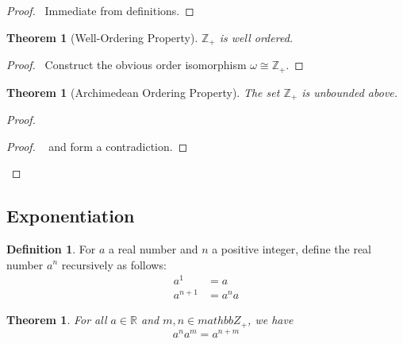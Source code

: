 \documentclass{book}
\let\qed\relax
\newtheorem{thm}[ax]{Theorem}
\theoremstyle{definition}
\newtheorem{df}[ax]{Definition}
\begin{document}
\begin{proof}
\pf\ Immediate from definitions. \qed
\end{proof}

\begin{thm}[Well-Ordering Property]
$\mathbb{Z}_+$ is well ordered.
\end{thm}

\begin{proof}
\pf\ Construct the obvious order isomorphism $\omega \cong \mathbb{Z}_+$. \qed
\end{proof}

\begin{thm}[Archimedean Ordering Property]
The set $\mathbb{Z}_+$ is unbounded above.
\end{thm}

\begin{proof}
\pf
{}
\qedstep
\begin{proof}
	\pf\  and  form a contradiction.
\end{proof}
\qed
\end{proof}

\subsection{Exponentiation}

\begin{df}
For $a$ a real number and $n$ a positive integer, define the real number $a^n$ recursively as follows:
\begin{align*}
a^1 & = a \\
a^{n+1} & = a^n a
\end{align*}
\end{df}

\begin{thm}
\label{thm:law_of_exponents_1}
For all $a \in \mathbb{R}$ and $m,n \in mathbb{Z}_+$, we have
\[ a^n a^m = a^{n+m} \]
\end{thm}
\end{document}
